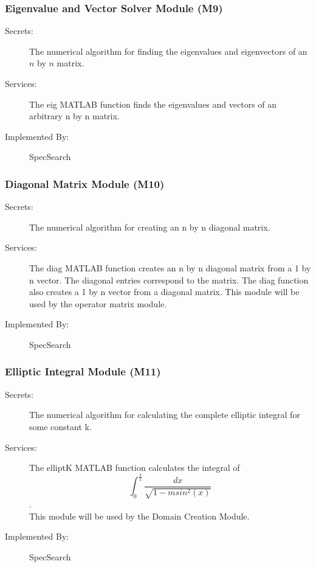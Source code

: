 \documentclass[12pt, titlepage]{article}
\begin{document}
\subsubsection{Eigenvalue and Vector Solver Module (M9)} 

\begin{description}
	\item[Secrets:] The numerical algorithm for finding the eigenvalues and 
	eigenvectors of an 
	$n$ by $n$ matrix.
	\item[Services:] The eig MATLAB function finds the eigenvalues and vectors 
	of an 
	arbitrary n by n matrix.
	\item[Implemented By:] SpecSearch
\end{description} 

\subsubsection{Diagonal Matrix Module (M10)} 

\begin{description}
	\item[Secrets:] The numerical algorithm for creating an n by n diagonal 
	matrix.
	\item[Services:] The diag MATLAB function creates an n by n diagonal matrix 
	from a 1 by n vector. The diagonal entries correspond to the matrix. The 
	diag function also creates a 1 by n vector from a diagonal matrix. This 
	module will be used by the operator matrix module. 
	\item[Implemented By:] SpecSearch
\end{description} 

\subsubsection{Elliptic Integral Module (M11)} 

\begin{description}
	\item[Secrets:] The numerical algorithm for calculating the complete 
	elliptic integral for some constant k. 
	\item[Services:] The elliptK MATLAB function calculates the integral of $$ 
	\int_{0}^{\frac{\pi}{2}} \frac{dx}{\sqrt{1-msin^{2}(x)}}$$. \\ 
	This module will be used by the Domain Creation Module. 
	\item[Implemented By:] SpecSearch
\end{description} 
\end{document}
